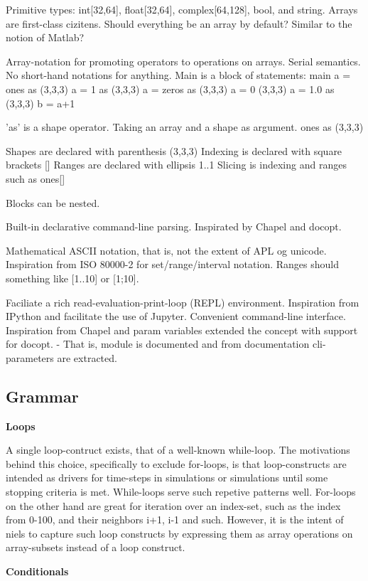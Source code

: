 \documentclass{sigplanconf}
\begin{document}
Primitive types: int[32,64], float[32,64], complex[64,128], bool, and string.
Arrays are first-class cizitens. Should everything be an array by default? Similar to the notion of Matlab?

Array-notation for promoting operators to operations on arrays.
Serial semantics.
No short-hand notations for anything.
Main is a block of statements:
main {
    a = ones as (3,3,3)
    a = 1 as (3,3,3)
    a = zeros as (3,3,3)
    a = 0 (3,3,3)
    a = 1.0 as (3,3,3)
    b = a+1
}

'as' is a shape operator. Taking an array and a shape as argument.
ones as (3,3,3)

Shapes are declared with parenthesis (3,3,3)
Indexing is declared with square brackets []
Ranges are declared with ellipsis 1..1
Slicing is indexing and ranges such as ones[]

Blocks can be nested.

Built-in declarative command-line parsing. Inspirated by Chapel and docopt.

Mathematical ASCII notation, that is, not the extent of APL og unicode.
Inspiration from ISO 80000-2 for set/range/interval notation.
Ranges should something like [1..10] or [1;10].

Faciliate a rich read-evaluation-print-loop (REPL) environment.
Inspiration from IPython and facilitate the use of Jupyter.
Convenient command-line interface.
Inspiration from Chapel and param variables extended the concept with support for docopt.
 - That is, module is documented and from documentation cli-parameters are extracted.

\subsection{Grammar}

\textbf{Loops}

A single loop-contruct exists, that of a well-known while-loop. The motivations behind this choice, specifically to exclude for-loops, is that loop-constructs are intended as drivers for time-steps in simulations or simulations until some stopping criteria is met. While-loops serve such repetive patterns well. For-loops on the other hand are great for iteration over an index-set, such as the index from 0-100, and their neighbors i+1, i-1 and such.
However, it is the intent of niels to capture such loop constructs by expressing them as array operations on array-subsets instead of a loop construct.

\textbf{Conditionals}
\end{document}

